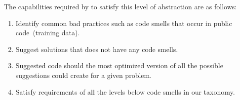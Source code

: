 The capabilities required by \cct{} to satisfy this level of abstraction are as follows:
\begin{enumerate}
    \item Identify common bad practices such as code smells that occur in public code~(training data).
    \item Suggest solutions that does not have any code smells.
    \item Suggested code should the most optimized version of all the possible suggestions \cct{} could create for a given problem.
    \item Satisfy requirements of all the levels below code smells in our taxonomy.
\end{enumerate}

